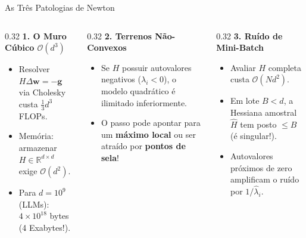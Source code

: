 \documentclass[aspectratio=169, 10pt]{beamer}
\begin{document}
\begin{frame}{As Três Patologias de Newton}
  \begin{columns}[T]
    \begin{column}{0.32\textwidth}
      \textbf{1. O Muro Cúbico $\mathcal{O}(d^3)$}
      \begin{itemize}
        \item Resolver $H \Delta\mathbf{w} = -\mathbf{g}$ via Cholesky custa $\frac{1}{3}d^3$ FLOPs.
        \item Memória: armazenar $H \in \mathbb{R}^{d \times d}$ exige $\mathcal{O}(d^2)$.
        \item Para $d = 10^9$ (LLMs): $4 \times 10^{18}$ bytes (4 Exabytes!).
      \end{itemize}
    \end{column}
    \begin{column}{0.32\textwidth}
      \textbf{2. Terrenos Não-Convexos}
      \begin{itemize}
        \item Se $H$ possuir autovalores negativos ($\lambda_i < 0$), o modelo quadrático é ilimitado inferiormente.
        \item O passo pode apontar para um \textbf{máximo local} ou ser atraído por \textbf{pontos de sela}!
      \end{itemize}
    \end{column}
    \begin{column}{0.32\textwidth}
      \textbf{3. Ruído de Mini-Batch}
      \begin{itemize}
        \item Avaliar $H$ completa custa $\mathcal{O}(Nd^2)$.
        \item Em lote $B < d$, a Hessiana amostral $\hat{H}$ tem posto $\le B$ (é singular!).
        \item Autovalores próximos de zero amplificam o ruído por $1/\hat{\lambda}_i$.
      \end{itemize}
    \end{column}
  \end{columns}
\end{frame}
\end{document}
